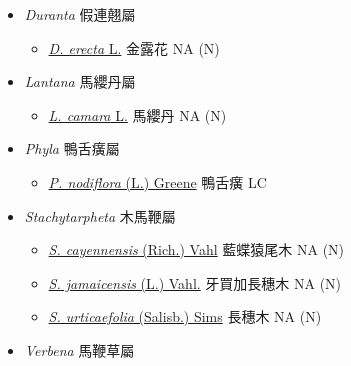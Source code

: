 
  \begin{itemize}
 \item[] \textit{Duranta} 假連翹屬
                                
  \begin{itemize}
        \item[] \href{http://www.theplantlist.org/tpl1.1/search?q=Duranta+erecta}{\textit{D. erecta} L.}   金露花   NA (N)
  \end{itemize}
 \item[] \textit{Lantana} 馬纓丹屬
                                
  \begin{itemize}
        \item[] \href{http://www.theplantlist.org/tpl1.1/search?q=Lantana+camara}{\textit{L. camara} L.}   馬纓丹   NA (N)
  \end{itemize}
 \item[] \textit{Phyla} 鴨舌癀屬
                                
  \begin{itemize}
        \item[] \href{http://www.theplantlist.org/tpl1.1/search?q=Phyla+nodiflora}{\textit{P. nodiflora} (L.) Greene}   鴨舌癀   LC
  \end{itemize}
 \item[] \textit{Stachytarpheta} 木馬鞭屬
                                
  \begin{itemize}
        \item[] \href{http://www.theplantlist.org/tpl1.1/search?q=Stachytarpheta+cayennensis}{\textit{S. cayennensis} (Rich.) Vahl}   藍蝶猿尾木   NA (N)
        \item[] \href{http://www.theplantlist.org/tpl1.1/search?q=Stachytarpheta+jamaicensis}{\textit{S. jamaicensis} (L.) Vahl.}   牙買加長穗木   NA (N)
        \item[] \href{http://www.theplantlist.org/tpl1.1/search?q=Stachytarpheta+urticaefolia}{\textit{S. urticaefolia} (Salisb.) Sims}   長穗木   NA (N)
  \end{itemize}
 \item[] \textit{Verbena} 馬鞭草屬
                                

\end{itemize}
